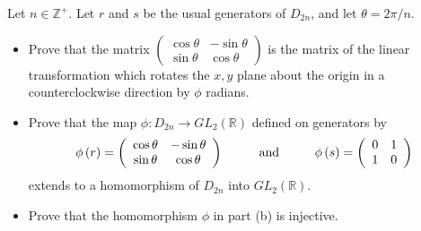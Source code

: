 \documentclass[12pt]{article}
\newenvironment{problem}[2][Exercise]{\begin{trivlist}
\item[\hskip \labelsep {\bfseries #1}\hskip \labelsep {\bfseries #2.}]}{\end{trivlist}}
\begin{document}
\begin{problem}{1.6.25}
Let $n\in \mathbb{Z}^+$. Let $r$ and $s$ be the usual generators of $D_{2n}$, and let $\theta = 2\pi/n$.
\begin{itemize}
    \item Prove that the matrix $\left( \begin{array}{cc} \cos \theta & -\sin \theta \\ \sin \theta & \cos \theta \end{array}\right)$ is the matrix of the linear transformation which rotates the $x,y$ plane about the origin in a counterclockwise direction by $\phi$ radians.
    \item Prove that the map $\phi: D_{2n}\rightarrow GL_2\left(\mathbb{R}\right)$ defined on generators by
    $$ \phi\left(r\right) = \left( \begin{array}{cc} \cos \theta & -\sin \theta \\ \sin \theta & \cos \theta \end{array}\right) \hspace{10mm} \text{and} \hspace{10mm} \phi\left(s\right)=\left(\begin{array}{cc} 0 & 1 \\ 1 & 0 \end{array} \right) $$ extends to a homomorphism of $D_{2n}$ into $GL_2\left(\mathbb{R}\right)$.
    \item Prove that the homomorphism $\phi$ in part (b) is injective.
\end{itemize}
\end{problem}
\end{document}
